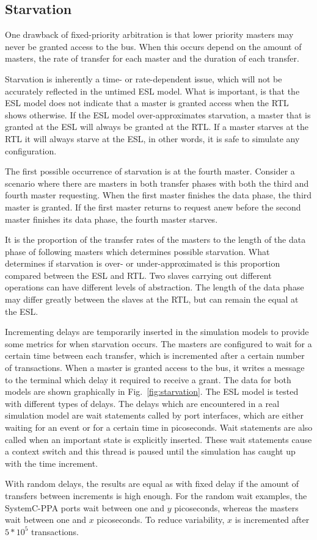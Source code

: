 \subsection{Starvation}
\label{sub:starvation}
One drawback of fixed-priority arbitration is that lower priority masters may never be granted access to the bus. When this occurs depend on the amount of masters, the rate of transfer for each master and the duration of each transfer. \par
Starvation is inherently a time- or rate-dependent issue, which will not be accurately reflected in the untimed ESL model. What is important, is that the ESL
model does not indicate that a master is granted access when the RTL shows otherwise. If the ESL model over-approximates starvation, a master that is granted
at the ESL will always be granted at the RTL. If a master starves at the RTL it will always starve at the ESL, in other words, it is safe to simulate any configuration. \par 
The first possible occurrence of starvation is at the fourth master. Consider a scenario where there are masters in both transfer phases with both the third and fourth master requesting. When the first master finishes the data phase, the third master is granted. If the first master returns to request anew before the second
master finishes its data phase, the fourth master starves. \par
It is the proportion of the transfer rates of the masters to the length of the data phase of following masters which determines possible starvation. What determines if starvation is over- or under-approximated is this proportion compared between the ESL and RTL. Two slaves carrying out different operations can
have different levels of abstraction. The length of the data phase may differ greatly between the slaves at the RTL, but can remain the equal at the ESL.\par   
Incrementing delays are temporarily inserted in the simulation models to provide some metrics for when starvation occurs. The masters are configured to wait for a certain time between each transfer, which is incremented after a certain number of transactions. When a master is granted access to the bus, it writes a message to the terminal which delay it required to receive a grant. The data for both models are shown graphically in Fig.~\ref{fig:starvation}. The ESL model is tested with different types of delays. The delays which are encountered in a real simulation model are wait statements called by port interfaces, which are either waiting for an event or for a certain time in picoseconds. Wait statements are also called when an important state is explicitly inserted. These wait statements cause a context switch and this thread is paused until the simulation has caught up with the time increment. \par
With random delays, the results are equal as with fixed delay if the amount of transfers between increments is high enough. For the random wait examples, the SystemC-PPA ports wait between one and $y$ picoseconds, whereas the masters wait between one and $x$ picoseconds. To reduce variability, $x$ is incremented after $5*10^5$ transactions.      


